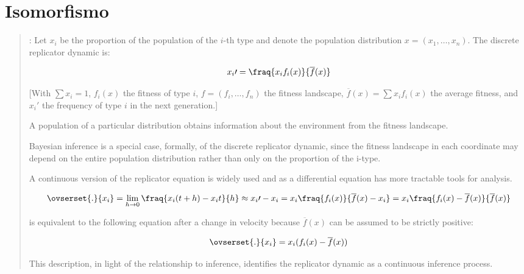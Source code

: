 \documentclass[a4paper,10pt]{article}
\begin{document}
\section{Isomorfismo}



\begin{quotation} \cite{harper2009-replicatorAsInference}:
    Let $x_i$ be the proportion of the population of the $i$-th type and denote the population distribution $x = (x_1 , \dots , x_n)$.
    The discrete replicator dynamic is:
    
    \begin{equation}
    x_i\prime = \fraq{x_i f_i(x)}{\overline{f}(x)}
    \end{equation}
    
    [With $\sum x_i = 1$, $f_i(x)$ the fitness of type $i$, $f=(f_i, \dots, f_n)$ the fitness landscape, $\overline{f}(x)=\sum x_i f_i(x)$ the average fitness, and $x_i\prime$ the frequency of type $i$ in the next generation.]
    
    A population of a particular distribution obtains information about the environment from the fitness landscape.

    Bayesian inference is a special case, formally, of the discrete replicator dynamic, since the fitness landscape in each coordinate may depend on the entire population distribution rather than only on the proportion of the i-type.
    
    A continuous version of the replicator equation is widely used and as a differential equation has more tractable tools for analysis.
    
    \begin{equation}
     \ovserset{.}{x_i} = \lim_{h \rightarrow 0} \fraq{x_i(t+h) - x_i{t}}{h} \approx x_i\prime - x_i = x_i \fraq{f_i(x)}{\overline{f}(x) - x_i} = x_i \fraq{f_i(x) - \overline{f}(x)}{\overline{f}(x)}
    \end{equation}
    
    is equivalent to the following equation after a change in velocity because $\overline{f}(x)$ can be assumed to be strictly positive:
    
    \begin{equation}
    \ovserset{.}{x_i} = x_i (f_i(x) - \overline{f}(x))
    \end{equation}
    
    This description, in light of the relationship to inference, identifies the replicator dynamic as a continuous inference process.
    

\end{quotation}
\end{document}
